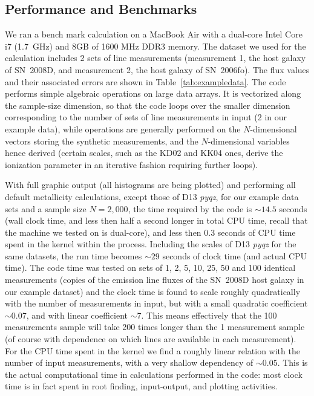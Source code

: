 \documentclass{emulateapj}
\begin{document}
\subsection{Performance and Benchmarks}
We ran a bench mark calculation on a MacBook Air with a dual-core Intel Core i7 (1.7~GHz) and 8GB of 1600 MHz DDR3 memory. The dataset we used for the calculation includes 2 sets of line measurements (measurement 1, the host galaxy of SN~2008D, and measurement 2, the host galaxy of SN~2006fo). The flux values and their associated errors are shown in Table~\ref{tab:exampledata}. The code performs simple algebraic operations on large data arrays. It is vectorized along the sample-size dimension, so that the code loops over the smaller dimension corresponding to the number of sets of line measurements in input (2 in our example data), while operations are generally performed on the $N$-dimensional vectors storing the synthetic measurements, and the $N$-dimensional variables hence derived (certain scales, such as the KD02 and KK04 ones, derive the ionization parameter in an iterative fashion requiring further loops).


With full graphic output (all histograms are being plotted) and performing all default metallicity calculations, except those of D13 \emph{pyqz}, for our example data sets and a sample size $N=2,000$, the time required by the code is $\sim14.5$ seconds (wall clock time, and less then half a second longer in total CPU time, recall that the machine we tested on is dual-core), and less then 0.3 seconds of CPU time spent in the kernel within the process. Including  the scales of D13 \emph{pyqz} for the same datasets, the run time becomes $\sim29$ seconds of clock time (and actual CPU time). 
The code time was tested on sets of 1, 2, 5, 10, 25, 50 and 100 identical measurements (copies of the emission line fluxes of  the SN~2008D host galaxy in our example dataset) and the clock time is found to scale roughly quadratically with the number of measurements in input, but with a small quadratic coefficient $\sim0.07$, and with linear coefficient $\sim7$. This means effectively that the 100 measurements sample will take 200 times longer than the 1 measurement sample (of course with dependence on which lines are available in each measurement). For the CPU time spent in the kernel we find a roughly linear relation with the number of input measurements, with a very shallow dependency of $\sim 0.05$. This is the actual computational time in calculations performed in the code: most clock time is in fact spent in root finding, input-output, and plotting activities.
\end{document}
